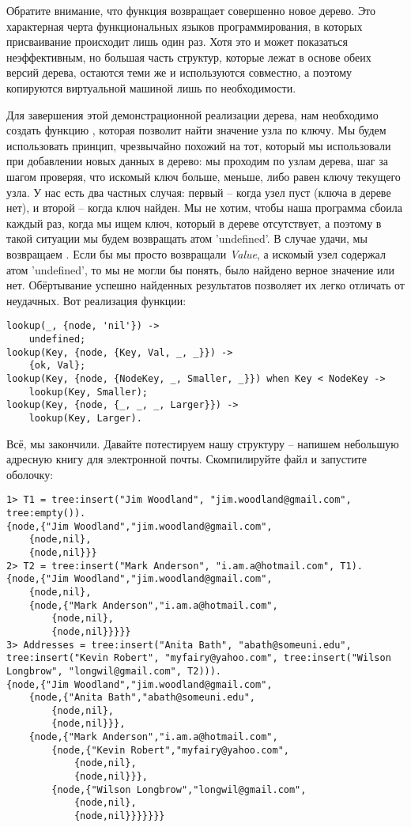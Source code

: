 Обратите внимание, что функция возвращает совершенно новое дерево.
Это характерная черта функциональных языков программирования, в которых присваивание происходит лишь один раз.
Хотя это и может показаться неэффективным, но большая часть структур, которые лежат в основе обеих версий дерева, остаются теми же и используются совместно, а поэтому копируются виртуальной машиной лишь по необходимости.

Для завершения этой демонстрационной реализации дерева, нам необходимо создать функцию , которая позволит найти значение узла по ключу.
Мы будем использовать принцип, чрезвычайно похожий на тот, который мы использовали при добавлении новых данных в дерево: мы проходим по узлам дерева, шаг за шагом проверяя, что искомый ключ больше, меньше, либо равен ключу текущего узла.
У нас есть два частных случая: первый \--- когда узел пуст (ключа в дереве нет), и второй \--- когда ключ найден.
Мы не хотим, чтобы наша программа сбоила каждый раз, когда мы ищем ключ, который в дереве отсутствует, а поэтому в такой ситуации мы будем возвращать атом 'undefined'.
В случае удачи, мы возвращаем .
Если бы мы просто возвращали \emph{Value}, а искомый узел содержал атом 'undefined', то мы не могли бы понять, было найдено верное значение или нет.
Обёртывание успешно найденных результатов позволяет их легко отличать от неудачных.
Вот реализация функции:
\begin{lstlisting}[style=erlang]
lookup(_, {node, 'nil'}) ->
    undefined;
lookup(Key, {node, {Key, Val, _, _}}) ->
    {ok, Val};
lookup(Key, {node, {NodeKey, _, Smaller, _}}) when Key < NodeKey ->
    lookup(Key, Smaller);
lookup(Key, {node, {_, _, _, Larger}}) ->
    lookup(Key, Larger).
\end{lstlisting}

Всё, мы закончили.
Давайте потестируем нашу структуру \--- напишем небольшую адресную книгу для электронной почты.
Скомпилируйте файл и запустите оболочку:
\begin{lstlisting}[style=erlang]
1> T1 = tree:insert("Jim Woodland", "jim.woodland@gmail.com", tree:empty()).
{node,{"Jim Woodland","jim.woodland@gmail.com",
    {node,nil},
    {node,nil}}}
2> T2 = tree:insert("Mark Anderson", "i.am.a@hotmail.com", T1).
{node,{"Jim Woodland","jim.woodland@gmail.com",
    {node,nil},
    {node,{"Mark Anderson","i.am.a@hotmail.com",
        {node,nil},
        {node,nil}}}}}
3> Addresses = tree:insert("Anita Bath", "abath@someuni.edu", tree:insert("Kevin Robert", "myfairy@yahoo.com", tree:insert("Wilson Longbrow", "longwil@gmail.com", T2))).
{node,{"Jim Woodland","jim.woodland@gmail.com",
    {node,{"Anita Bath","abath@someuni.edu",
        {node,nil},
        {node,nil}}},
    {node,{"Mark Anderson","i.am.a@hotmail.com",
        {node,{"Kevin Robert","myfairy@yahoo.com",
            {node,nil},
            {node,nil}}},
        {node,{"Wilson Longbrow","longwil@gmail.com",
            {node,nil},
            {node,nil}}}}}}}
\end{lstlisting}

